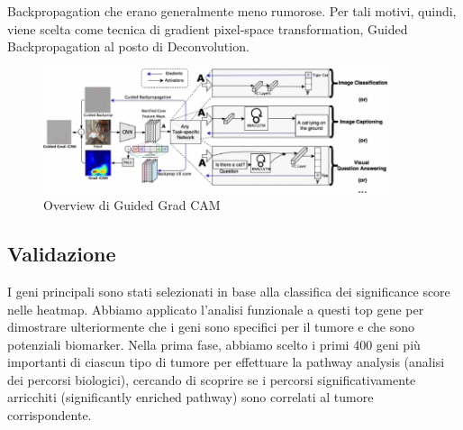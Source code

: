 Backpropagation che erano generalmente meno rumorose. Per tali motivi, quindi, viene scelta come tecnica di 
gradient pixel-space transformation, Guided Backpropagation al posto di Deconvolution.
 \begin{figure}[h]
            \centering
            \includegraphics[width=0.9\textwidth]{images/Guided Grad-Cam/large_Guided_GradCam.png}
            \caption{Overview di Guided Grad CAM \cite{selvaraju2017grad}}
            \label{fig:GuidedGCam}
        \end{figure}
        
\subsection{Validazione}
I geni principali sono stati selezionati in base alla classifica dei significance score nelle heatmap. Abbiamo 
applicato l'analisi funzionale a questi top gene per dimostrare ulteriormente che i geni sono specifici per il tumore 
e che sono potenziali biomarker. 
Nella prima fase, abbiamo scelto i primi 400 geni più importanti di ciascun tipo di tumore per effettuare la pathway
analysis (analisi dei percorsi biologici), cercando di scoprire se i percorsi significativamente arricchiti
(significantly enriched pathway) sono correlati al tumore corrispondente. 

